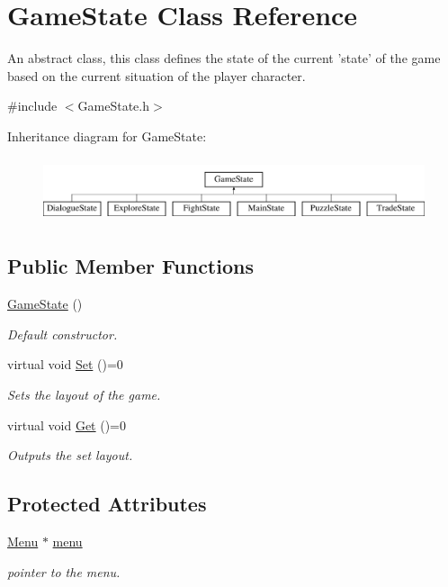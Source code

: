 \hypertarget{classGameState}{\section{Game\-State Class Reference}
\label{classGameState}
}


An abstract class, this class defines the state of the current 'state' of the game based on the current situation of the player character.  




{\ttfamily \#include $<$Game\-State.\-h$>$}

Inheritance diagram for Game\-State\-:\begin{figure}[H]
\begin{center}
\leavevmode
\includegraphics[height=1.904762cm]{classGameState}
\end{center}
\end{figure}
\subsection*{Public Member Functions}
\begin{DoxyCompactItemize}
\item 
\hyperlink{classGameState_a4fa0a2bf50315c4a35a3890a0adcee5c}{Game\-State} ()
\begin{DoxyCompactList}\small\item\em Default constructor. \end{DoxyCompactList}\item 
virtual void \hyperlink{classGameState_af22e9a43999f99b784a35fab85cd9208}{Set} ()=0
\begin{DoxyCompactList}\small\item\em Sets the layout of the game. \end{DoxyCompactList}\item 
virtual void \hyperlink{classGameState_a4283cb3aa5637d4815d64272843a0625}{Get} ()=0
\begin{DoxyCompactList}\small\item\em Outputs the set layout. \end{DoxyCompactList}\end{DoxyCompactItemize}
\subsection*{Protected Attributes}
\begin{DoxyCompactItemize}
\item 
\hyperlink{classMenu}{Menu} $\ast$ \hyperlink{classGameState_aebc12d6e90edfbe51a571858f6288f93}{menu}
\begin{DoxyCompactList}\small\item\em pointer to the menu. \end{DoxyCompactList}\end{DoxyCompactItemize}



